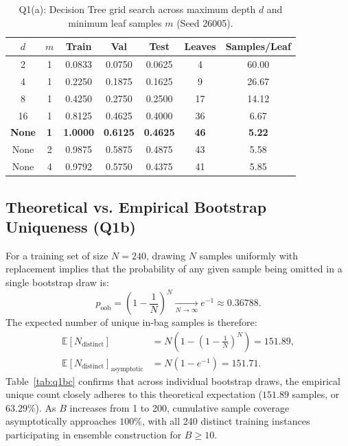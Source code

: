 \documentclass[10pt,twocolumn,letterpaper]{article}
\begin{document}
\begin{table}[t]
\centering
\small
\caption{Q1(a): Decision Tree grid search across maximum depth $d$ and minimum leaf samples $m$ (Seed 26005).}
\label{tab:q1a}
\begin{tabular}{ccccccc}
\toprule
$d$ & $m$ & Train & Val & Test & Leaves & Samples/Leaf \\
\midrule
2 & 1 & 0.0833 & 0.0750 & 0.0625 & 4 & 60.00 \\
4 & 1 & 0.2250 & 0.1875 & 0.1625 & 9 & 26.67 \\
8 & 1 & 0.4250 & 0.2750 & 0.2500 & 17 & 14.12 \\
16 & 1 & 0.8125 & 0.4625 & 0.4000 & 36 & 6.67 \\
\textbf{None} & \textbf{1} & \textbf{1.0000} & \textbf{0.6125} & \textbf{0.4625} & \textbf{46} & \textbf{5.22} \\
None & 2 & 0.9875 & 0.5875 & 0.4875 & 43 & 5.58 \\
None & 4 & 0.9792 & 0.5750 & 0.4375 & 41 & 5.85 \\
\bottomrule
\end{tabular}
\end{table}

\subsection{Theoretical vs. Empirical Bootstrap Uniqueness (Q1b)}
For a training set of size $N=240$, drawing $N$ samples uniformly with replacement implies that the probability of any given sample being omitted in a single bootstrap draw is:
\begin{equation}
    p_{\text{oob}} = \left(1 - \frac{1}{N}\right)^N \xrightarrow[N \to \infty]{} e^{-1} \approx 0.36788.
\end{equation}
The expected number of unique in-bag samples is therefore:
\begin{align}
    \mathbb{E}[N_{\text{distinct}}] &= N \left(1 - \left(1 - \frac{1}{N}\right)^N\right) = 151.89, \\
    \mathbb{E}[N_{\text{distinct}}]_{\text{asymptotic}} &= N (1 - e^{-1}) = 151.71.
\end{align}
Table~\ref{tab:q1bc} confirms that across individual bootstrap draws, the empirical unique count closely adheres to this theoretical expectation ($151.89$ samples, or $63.29\%$). As $B$ increases from 1 to 200, cumulative sample coverage asymptotically approaches $100\%$, with all 240 distinct training instances participating in ensemble construction for $B \ge 10$.
\end{document}
